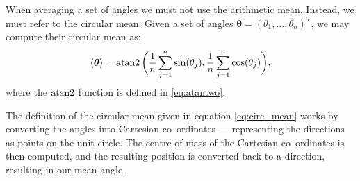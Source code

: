 When averaging a set of angles we must not use the arithmetic mean. Instead, we must refer to the circular mean. Given a set of angles $\bm{\theta} = (\theta_1, \ldots, \theta_n)^T$, we may compute their circular mean as:
\begin{equation}
	\label{eq:circ_mean}
	\langle \bm{\theta} \rangle = \operatorname{atan2}\bigg(\frac{1}{n} \sum_{j=1}^n \sin(\theta_j), \frac{1}{n} \sum_{j=1}^n \cos(\theta_j)\bigg),
\end{equation}
where the $\operatorname{atan2}$ function is defined in \cref{eq:atantwo}.

The definition of the circular mean given in equation \cref{eq:circ_mean} works by converting the angles into Cartesian co--ordinates --- representing the directions as points on the unit circle. The centre of mass of the Cartesian co--ordinates is then computed, and the resulting position is converted back to a direction, resulting in our mean angle.
